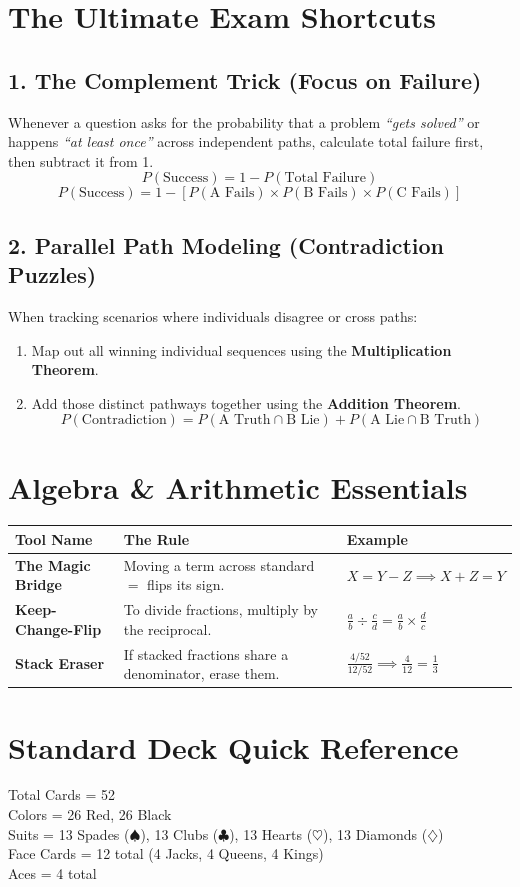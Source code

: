 \documentclass[11pt,a4paper]{article}
\begin{document}
\section{The Ultimate Exam Shortcuts}

\subsection{1. The Complement Trick (Focus on Failure)}
Whenever a question asks for the probability that a problem \textit{``gets solved''} or happens \textit{``at least once''} across independent paths, calculate total failure first, then subtract it from 1.
\[ P(\text{Success}) = 1 - P(\text{Total Failure}) \]
\[ P(\text{Success}) = 1 - \left[ P(\text{A Fails}) \times P(\text{B Fails}) \times P(\text{C Fails}) \right] \]

\subsection{2. Parallel Path Modeling (Contradiction Puzzles)}
When tracking scenarios where individuals disagree or cross paths:
\begin{enumerate}
    \item Map out all winning individual sequences using the \textbf{Multiplication Theorem}.
    \item Add those distinct pathways together using the \textbf{Addition Theorem}.
    \[ P(\text{Contradiction}) = P(\text{A Truth} \cap \text{B Lie}) + P(\text{A Lie} \cap \text{B Truth}) \]
\end{enumerate}

\section{Algebra \& Arithmetic Essentials}
\begin{table}[h]
\centering
\begin{tabular}{lll}
\toprule
\textbf{Tool Name} & \textbf{The Rule} & \textbf{Example} \\ \midrule
\textbf{The Magic Bridge} & Moving a term across standard $=$ flips its sign. & $X = Y - Z \implies X + Z = Y$ \\
\textbf{Keep-Change-Flip} & To divide fractions, multiply by the reciprocal. & $\frac{a}{b} \div \frac{c}{d} = \frac{a}{b} \times \frac{d}{c}$ \\
\textbf{Stack Eraser} & If stacked fractions share a denominator, erase them. & $\frac{4/52}{12/52} \implies \frac{4}{12} = \frac{1}{3}$ \\ \bottomrule
\end{tabular}
\end{table}

\section{Standard Deck Quick Reference}
Total Cards = 52 \\
Colors = 26 Red, 26 Black \\
Suits = 13 Spades ($\spadesuit$), 13 Clubs ($\clubsuit$), 13 Hearts ($\heartsuit$), 13 Diamonds ($\diamondsuit$) \\
Face Cards = 12 total (4 Jacks, 4 Queens, 4 Kings) \\
Aces = 4 total
\end{document}
